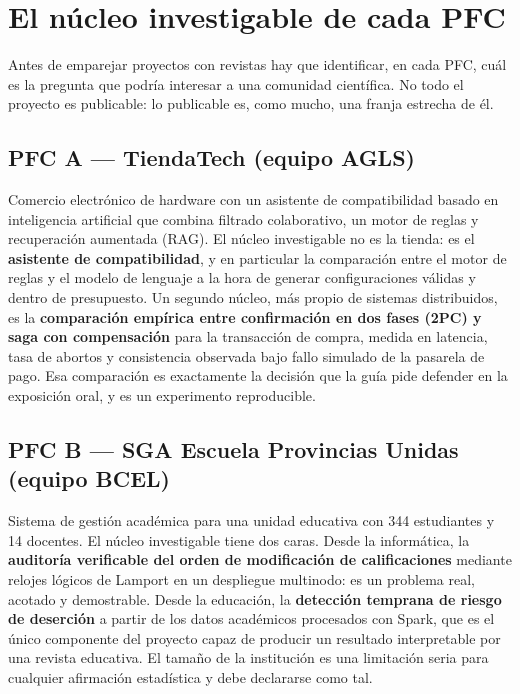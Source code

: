 \documentclass[11pt,a4paper]{article}
\begin{document}
\section{El núcleo investigable de cada PFC}

Antes de emparejar proyectos con revistas hay que identificar, en cada PFC, cuál es la pregunta que podría interesar a una comunidad científica. No todo el proyecto es publicable: lo publicable es, como mucho, una franja estrecha de él.

\subsection{PFC A --- TiendaTech (equipo AGLS)}

Comercio electrónico de hardware con un asistente de compatibilidad basado en inteligencia artificial que combina filtrado colaborativo, un motor de reglas y recuperación aumentada (RAG). El núcleo investigable no es la tienda: es el \textbf{asistente de compatibilidad}, y en particular la comparación entre el motor de reglas y el modelo de lenguaje a la hora de generar configuraciones válidas y dentro de presupuesto. Un segundo núcleo, más propio de sistemas distribuidos, es la \textbf{comparación empírica entre confirmación en dos fases (2PC) y saga con compensación} para la transacción de compra, medida en latencia, tasa de abortos y consistencia observada bajo fallo simulado de la pasarela de pago. Esa comparación es exactamente la decisión que la guía pide defender en la exposición oral, y es un experimento reproducible.

\subsection{PFC B --- SGA Escuela Provincias Unidas (equipo BCEL)}

Sistema de gestión académica para una unidad educativa con 344 estudiantes y 14 docentes. El núcleo investigable tiene dos caras. Desde la informática, la \textbf{auditoría verificable del orden de modificación de calificaciones} mediante relojes lógicos de Lamport en un despliegue multinodo: es un problema real, acotado y demostrable. Desde la educación, la \textbf{detección temprana de riesgo de deserción} a partir de los datos académicos procesados con Spark, que es el único componente del proyecto capaz de producir un resultado interpretable por una revista educativa. El tamaño de la institución es una limitación seria para cualquier afirmación estadística y debe declararse como tal.
\end{document}
